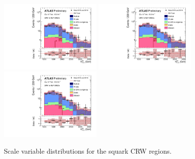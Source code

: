 \begin{figure}[tbph]
\begin{center}
\includegraphics[width=0.45\textwidth]{figures/ATLAS-CONF-2016-078_INT/N-1Plots/AtlasStyle/Preliminary/CRW_SRJigsawSRS2b_LastCut_CRW_minusone}
\includegraphics[width=0.45\textwidth]{figures/ATLAS-CONF-2016-078_INT/N-1Plots/AtlasStyle/Preliminary/CRW_SRJigsawSRS3a_LastCut_CRW_minusone}
\includegraphics[width=0.45\textwidth]{figures/ATLAS-CONF-2016-078_INT/N-1Plots/AtlasStyle/Preliminary/CRW_SRJigsawSRS3b_LastCut_CRW_minusone}
\end{center}
\caption{Scale variable distributions for the squark CRW regions.}
\label{fig:CRW_SRJigsawSRS1a_LastCut_CRW_minusone}
\end{figure}


\clearpage

